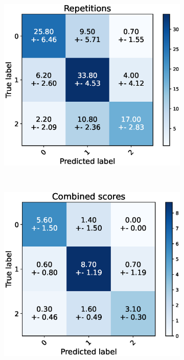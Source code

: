 \begin{figure}[H]
  \centering
  \begin{subfigure}[t]{0.48\textwidth}
      \includegraphics[width=\textwidth]{files/figs/res/femval/cnf-reps.eps}
      \caption{}
      \label{fig:femval-cnf-reps}
  \end{subfigure}
  ~
  \begin{subfigure}[t]{0.48\textwidth}
      \includegraphics[width=\textwidth]{files/figs/res/femval/cnf-combined.eps}
      \caption{}
      \label{fig:femval-cnf-comb}
  \end{subfigure}


\end{figure}
